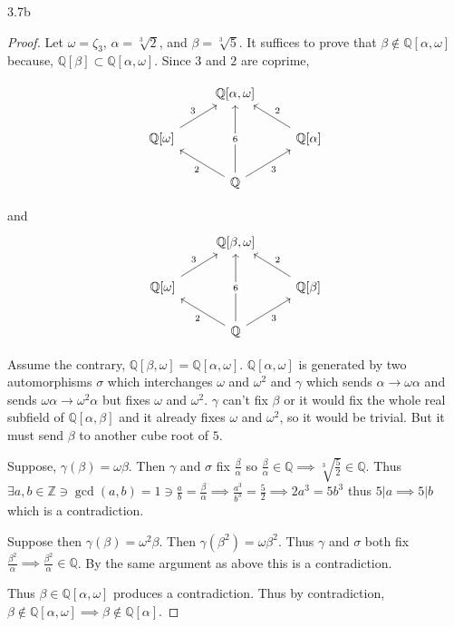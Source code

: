 \documentclass{article}
\newcommand{\Q}{\mathbb{Q}}
\newcommand{\Z}{\mathbb{Z}}
\begin{document}
\begin{PROB}{3.7b}\label{Problem 3.7b.}
\end{PROB}
\begin{proof}
    Let $\omega = \zeta_3$, $\alpha = \sqrt[3]{2}$, and $\beta = \sqrt[3]{5}$. It suffices to prove that $\beta \not \in \Q[\alpha, \omega]$ because, $\Q[\beta] \subset \Q[\alpha, \omega]$. Since $3$ and $2$ are coprime, 
    
    \[\begin{tikzcd}
        & {\Q[\alpha, \omega]} \\
        {\Q[\omega]} && {\Q[\alpha]} \\
        & \Q
        \arrow["3"', from=3-2, to=2-3]
        \arrow["2", from=3-2, to=2-1]
        \arrow["3", from=2-1, to=1-2]
        \arrow["2"', from=2-3, to=1-2]
        \arrow["6"{description}, from=3-2, to=1-2]
    \end{tikzcd}\]

    and 
    \[\begin{tikzcd}
        & {\Q[\beta, \omega]} \\
        {\Q[\omega]} && {\Q[\beta]} \\
        & \Q
        \arrow["3"', from=3-2, to=2-3]
        \arrow["2", from=3-2, to=2-1]
        \arrow["3", from=2-1, to=1-2]
        \arrow["2"', from=2-3, to=1-2]
        \arrow["6"{description}, from=3-2, to=1-2]
    \end{tikzcd}\]

    Assume the contrary, $\Q[\beta, \omega] = \Q[\alpha, \omega]$. $\Q[\alpha, \omega]$ is generated by two automorphisms $\sigma$ which interchanges $\omega$ and $\omega^2$ and $\gamma$ which sends $\alpha \to \omega \alpha$ and sends $\omega \alpha \to \omega^2 \alpha$ but fixes $\omega$ and $\omega^2$. $\gamma$ can't fix $\beta$ or it would fix the whole real subfield of $\Q[\alpha, \beta]$ and it already fixes $\omega$ and $\omega^2$, so it would be trivial. But it must send $\beta$ to another cube root of $5$. 
    
    Suppose, $\gamma(\beta) = \omega \beta$. Then $\gamma$ and $\sigma$ fix $\frac{\beta}{\alpha}$ so $\frac{\beta}{\alpha} \in \Q \implies \sqrt[3]{\frac{5}{2}} \in \Q$. Thus $\exists a, b \in \Z \ni \gcd(a, b) = 1 \ni \frac{a}{b} = \frac{\beta}{\alpha} \implies \frac{a^3}{b^3} = \frac{5}{2} \implies 2a^3 = 5b^3$ thus $5 | a \implies 5 | b$ which is a contradiction.    
    
    Suppose then $\gamma(\beta) = \omega ^2 \beta$. Then $\gamma(\beta^2) = \omega \beta^2$. Thus $\gamma$ and $\sigma$ both fix $\frac{\beta^2}{\alpha} \implies \frac{\beta^2}{\alpha} \in \Q$. By the same argument as above this is a contradiction.
    
    Thus $\beta \in \Q[\alpha, \omega]$ produces a contradiction. Thus by contradiction, $\beta \not \in \Q[\alpha, \omega] \implies \beta \not \in \Q[\alpha]$.
\end{proof}
\end{document}

